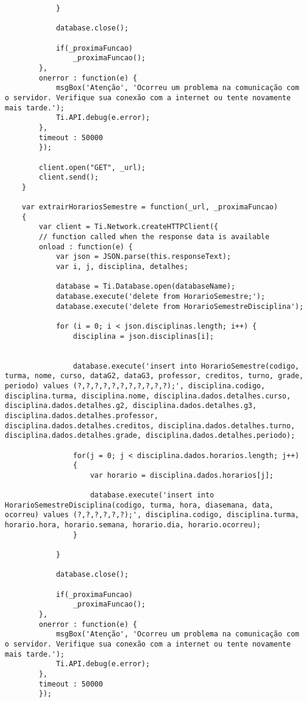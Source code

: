 \begin{lstlisting}
			}
			
			database.close();
    		
     		if(_proximaFuncao)	
     			_proximaFuncao();  
    	},
     	onerror : function(e) {
     		msgBox('Atenção', 'Ocorreu um problema na comunicação com o servidor. Verifique sua conexão com a internet ou tente novamente mais tarde.');
         	Ti.API.debug(e.error);
    	},
     	timeout : 50000  
 		});
 	
		client.open("GET", _url);
 		client.send();  
 	}
 	
 	var extrairHorariosSemestre = function(_url, _proximaFuncao)
 	{
 		var client = Ti.Network.createHTTPClient({
     	// function called when the response data is available
    	onload : function(e) {
			var json = JSON.parse(this.responseText);
     		var i, j, disciplina, detalhes;
			
			database = Ti.Database.open(databaseName);
			database.execute('delete from HorarioSemestre;');
			database.execute('delete from HorarioSemestreDisciplina');
			
			for (i = 0; i < json.disciplinas.length; i++) {
				disciplina = json.disciplinas[i];


				database.execute('insert into HorarioSemestre(codigo, turma, nome, curso, dataG2, dataG3, professor, creditos, turno, grade, periodo) values (?,?,?,?,?,?,?,?,?,?,?);', disciplina.codigo, disciplina.turma, disciplina.nome, disciplina.dados.detalhes.curso, disciplina.dados.detalhes.g2, disciplina.dados.detalhes.g3, disciplina.dados.detalhes.professor, disciplina.dados.detalhes.creditos, disciplina.dados.detalhes.turno, disciplina.dados.detalhes.grade, disciplina.dados.detalhes.periodo);
				
				for(j = 0; j < disciplina.dados.horarios.length; j++)
				{
					var horario = disciplina.dados.horarios[j];
					
					database.execute('insert into HorarioSemestreDisciplina(codigo, turma, hora, diasemana, data, ocorreu) values (?,?,?,?,?,?);', disciplina.codigo, disciplina.turma, horario.hora, horario.semana, horario.dia, horario.ocorreu);
				}
				
			}
			
			database.close();

     		if(_proximaFuncao)	
     			_proximaFuncao();  
    	},
     	onerror : function(e) {
     		msgBox('Atenção', 'Ocorreu um problema na comunicação com o servidor. Verifique sua conexão com a internet ou tente novamente mais tarde.');
         	Ti.API.debug(e.error);
    	},
     	timeout : 50000 
 		});
 	

\end{lstlisting}
